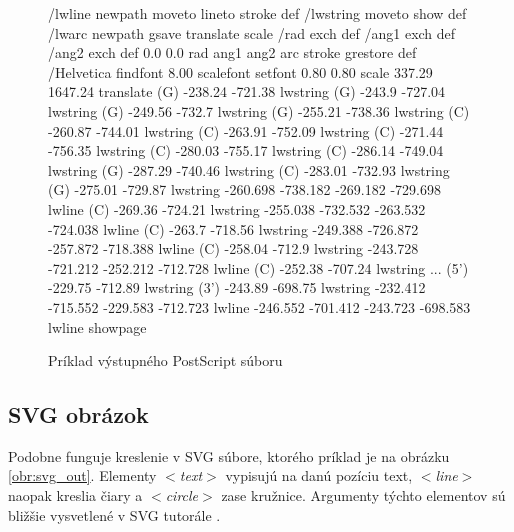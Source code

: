 \begin{figure}
\begin{code}[fontsize=\scriptsize, frame=none, samepage=true]
/lwline {newpath moveto lineto stroke} def
/lwstring {moveto show} def
/lwarc {newpath gsave translate scale /rad exch def /ang1 exch def
  /ang2 exch def 0.0 0.0 rad ang1 ang2 arc stroke grestore} def
/Helvetica findfont 8.00 scalefont setfont
0.80 0.80 scale
337.29 1647.24 translate
(G)            -238.24        -721.38        lwstring       
(G)            -243.9         -727.04        lwstring       
(G)            -249.56        -732.7         lwstring       
(G)            -255.21        -738.36        lwstring       
(C)            -260.87        -744.01        lwstring       
(C)            -263.91        -752.09        lwstring       
(C)            -271.44        -756.35        lwstring       
(C)            -280.03        -755.17        lwstring       
(C)            -286.14        -749.04        lwstring       
(G)            -287.29        -740.46        lwstring       
(C)            -283.01        -732.93        lwstring       
(G)            -275.01        -729.87        lwstring       
-260.698       -738.182       -269.182       -729.698        lwline
(C)            -269.36        -724.21        lwstring       
-255.038       -732.532       -263.532       -724.038        lwline
(C)            -263.7         -718.56        lwstring       
-249.388       -726.872       -257.872       -718.388        lwline
(C)            -258.04        -712.9         lwstring       
-243.728       -721.212       -252.212       -712.728        lwline
(C)            -252.38        -707.24        lwstring       
  ...
(5')           -229.75        -712.89        lwstring
(3')           -243.89        -698.75        lwstring
-232.412       -715.552       -229.583       -712.723        lwline
-246.552       -701.412       -243.723       -698.583        lwline
showpage
\end{code}
\caption{Príklad výstupného PostScript súboru}
\label{obr:ps_out}
\end{figure}



\newcommand{\tagt}[1]{\mbox{$<$\textit{#1}$>$}}

\subsection{SVG obrázok}

Podobne funguje kreslenie v SVG súbore, ktorého príklad je na obrázku \ref{obr:svg_out}.
Elementy \tagt{text} vypisujú na danú pozíciu text, \tagt{line}
naopak kreslia čiary a \tagt{circle} zase kružnice.
Argumenty týchto elementov sú bližšie vysvetlené v SVG tutorále .


